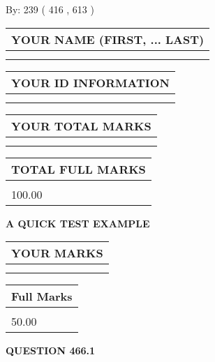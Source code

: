 \documentclass[12pt]{article}
\begin{document}
   
\hspace{1.0in} By: 
 239 ( 416 ,  613 )
   
   
   
   
\newpage 
\setcounter{page}{ 
   466001 } 
   
   
   
   
\noindent\begin{tabular}{|l|}
\hline
YOUR NAME (FIRST, ... LAST)  \\
\hline
 \\ 
 \\ 
\hline
\end{tabular}
\hspace{0.05in} \begin{tabular}{|l|}
\hline
 YOUR   ID   INFORMATION  \\
\hline
 \\ 
 \\ 
\hline
\end{tabular}
   
   
\vspace{0.2in}\noindent\begin{tabular}{|l|}
\hline
YOUR TOTAL MARKS  \\
\hline
 \\ 
 \\ 
\hline
\end{tabular}
\hspace{0.05in} \begin{tabular}{|l|}
\hline
TOTAL FULL MARKS  \\
\hline
 \\ 
100.00 \\
\hline
\end{tabular}
   
   
 \vspace{0.2in}
{\LARGE {\textbf{ A QUICK TEST EXAMPLE}}}
   
   
  
\vspace{0.2in}
  
\noindent\begin{tabular}{|l|}
\hline
 YOUR MARKS  \\
\hline
 \\ 
 \\ 
\hline
\end{tabular}
\hspace{0.05in} \begin{tabular}{|l|}
\hline
 Full Marks  \\
\hline
 \\ 
50.00 \\
\hline
\end{tabular}
{\textbf{\Large{QUESTION
466.1 
}}}
  
\end{document}
